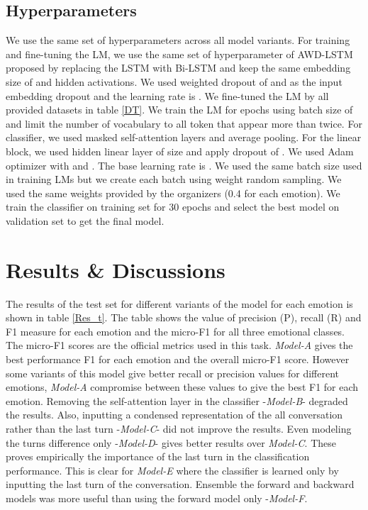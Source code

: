 \documentclass{article}
\begin{document}
\subsection{Hyperparameters}
We use the same set of hyperparameters across all model variants. For training and fine-tuning the LM, we use the same set of hyperparameter of AWD-LSTM proposed by \cite{meri_1} replacing the LSTM with Bi-LSTM and keep the same embedding size of  and  hidden activations. We used weighted dropout of  and  as the input embedding dropout and the learning rate is . We fine-tuned the LM by all provided datasets in table \ref{DT}. We train the LM for  epochs using batch size of  and limit the number of vocabulary to all token that appear more than twice. 
 For classifier, we used masked self-attention layers and average pooling. For the linear block, we used hidden linear layer of size  and apply dropout of . We used Adam optimizer \cite{adam} with  and . The base learning rate is . We used the same batch size used in training LMs but we create each batch using weight random sampling. We used the same weights provided by the organizers 
(0.4 for each emotion). We train the classifier on training set for 30 epochs and select the best model on validation set to get the final model.


\section{Results \& Discussions}\label{XPR}
The results of the test set for different variants of the model for each emotion is shown in table \ref{Res_t}. The table shows the value of precision (P), recall (R) and F1 measure for each emotion and the micro-F1 for all three emotional classes. The micro-F1 scores are the official metrics used in this task. \textit{Model-A} gives the best performance F1 for each emotion and the overall micro-F1 score. However some variants of this model give better recall or precision values for different emotions, \textit{Model-A} compromise between these values to give the best F1 for each emotion. Removing the self-attention layer in the classifier -\textit{Model-B}- degraded the results. Also, inputting a condensed representation of the all conversation rather than the last turn -\textit{Model-C}- did not improve the results. Even modeling the turns difference only -\textit{Model-D}- gives better results over \textit{Model-C}. These proves empirically the importance of the last turn in the classification performance. This is clear for \textit{Model-E} where the classifier is learned only by inputting the last turn of the conversation. Ensemble the forward and backward models was more useful than using the forward model only -\textit{Model-F}.
\end{document}
